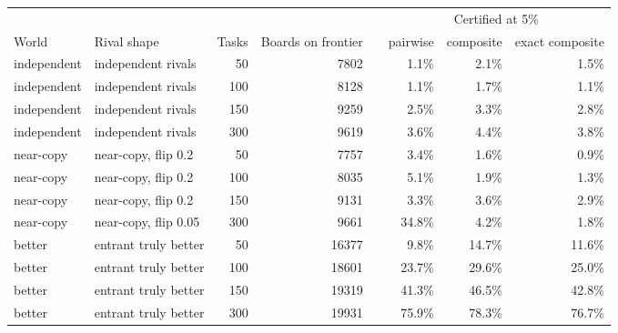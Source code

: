 \begin{tabular}{llrrrrrr}
\toprule
 & & & & & \multicolumn{3}{c}{Certified at 5\%} \\
World & Rival shape & Tasks & Boards on frontier & & pairwise & composite & exact composite \\
\midrule
independent & independent rivals & 50 & 7802 & & 1.1\% & 2.1\% & 1.5\% \\
independent & independent rivals & 100 & 8128 & & 1.1\% & 1.7\% & 1.1\% \\
independent & independent rivals & 150 & 9259 & & 2.5\% & 3.3\% & 2.8\% \\
independent & independent rivals & 300 & 9619 & & 3.6\% & 4.4\% & 3.8\% \\
near-copy & near-copy, flip 0.2 & 50 & 7757 & & 3.4\% & 1.6\% & 0.9\% \\
near-copy & near-copy, flip 0.2 & 100 & 8035 & & 5.1\% & 1.9\% & 1.3\% \\
near-copy & near-copy, flip 0.2 & 150 & 9131 & & 3.3\% & 3.6\% & 2.9\% \\
near-copy & near-copy, flip 0.05 & 300 & 9661 & & 34.8\% & 4.2\% & 1.8\% \\
better & entrant truly better & 50 & 16377 & & 9.8\% & 14.7\% & 11.6\% \\
better & entrant truly better & 100 & 18601 & & 23.7\% & 29.6\% & 25.0\% \\
better & entrant truly better & 150 & 19319 & & 41.3\% & 46.5\% & 42.8\% \\
better & entrant truly better & 300 & 19931 & & 75.9\% & 78.3\% & 76.7\% \\
\bottomrule
\end{tabular}
